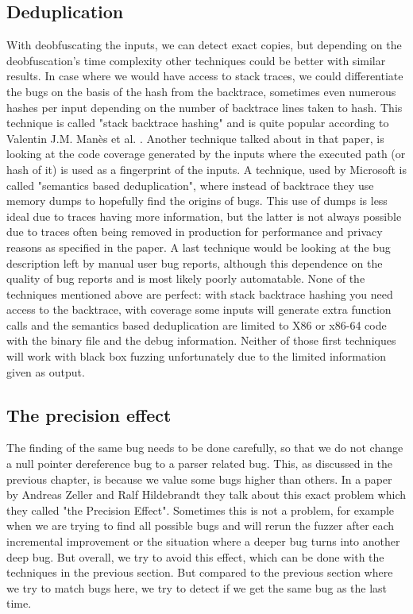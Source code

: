 \subsection{Deduplication}
\label{inputReduction:Deduplication}
With deobfuscating the inputs, we can detect exact copies, but depending on the deobfuscation's time complexity other techniques could be better with similar results. In case where we would have access to stack traces, we could differentiate the bugs on the basis of the hash from the backtrace, sometimes even numerous hashes per input depending on the number of backtrace lines taken to hash. This technique is called "stack backtrace hashing" and is quite popular according to Valentin J.M. Man\`es et al. \cite{13manes2019survey}.
Another technique talked about in that paper, is looking at the code coverage generated by the inputs where the executed path (or hash of it) is used as a fingerprint of the inputs. A technique, used by Microsoft \cite{36semanticsAwareDeduplicationRETracer} is called "semantics based deduplication", where instead of backtrace they use memory dumps to hopefully find the origins of bugs. This use of dumps is less ideal due to traces having more information, but the latter is not always possible due to traces often being removed in production for performance and privacy reasons as specified in the paper. 
A last technique would be looking at the bug description left by manual user bug reports, although this dependence on the quality of bug reports and is most likely poorly automatable.
None of the techniques mentioned above are perfect: with stack backtrace hashing you need access to the backtrace, with coverage some inputs will generate extra function calls and the semantics based deduplication are limited to X86 or x86-64 code with the binary file and the debug information. Neither of those first techniques will work with black box fuzzing unfortunately due to the limited information given as output.

\subsection{The precision effect}
\label{inputReduction:PersisionEffect}
The finding of the same bug needs to be done carefully, so that we do not change a null pointer dereference bug to a parser related bug. This, as discussed in the previous chapter, is because we value some bugs higher than others. 
In a paper by Andreas Zeller and Ralf Hildebrandt \cite{5zeller2002simplifyingIsolatingFailure-inducing} they talk about this exact problem which they called "the Precision Effect". Sometimes this is not a problem, for example when we are trying to find all possible bugs and will rerun the fuzzer after each incremental improvement or the situation where a deeper bug turns into another deep bug. But overall, we try to avoid this effect, which can be done with the techniques in the previous section. But compared to the previous section where we try to match bugs here, we try to detect if we get the same bug as the last time.

